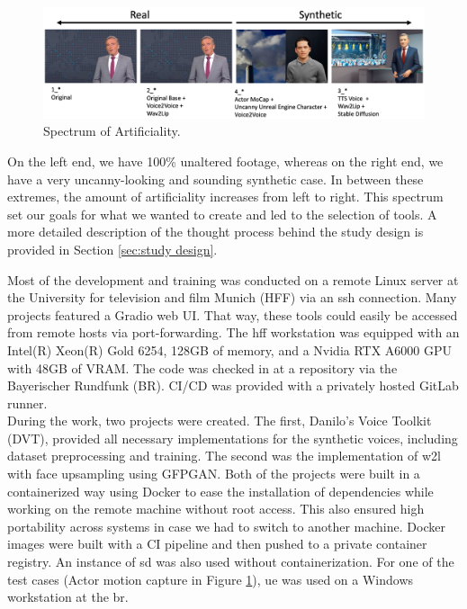 \documentclass[
  a4paper,  %
  twoside,  %
  bibliography=totoc,
  headsepline,
  cleardoublepage=empty,
  parskip=half,
  draft=false
]{scrbook}
\begin{document}
\begin{figure}[h]
  \centering
  \includegraphics[width=1\textwidth]{./graphics/spectrum-art.png}
  \caption{Spectrum of Artificiality.}
  \label{fig:spectrum}
\end{figure}

On the left end, we have 100\% unaltered footage, whereas on the right end, we have a very uncanny-looking and sounding synthetic case. In between these extremes, the amount of artificiality increases from left to right. This spectrum set our goals for what we wanted to create and led to the selection of tools. A more detailed description of the thought process behind the study design is provided in Section \ref{sec:study design}.

Most of the development and training was conducted on a remote Linux server at the University for television and film Munich (HFF) via an \gls{ssh} connection. Many projects featured a Gradio web UI. That way, these tools could easily be accessed from remote hosts via port-forwarding. The \gls{hff} workstation was equipped with an Intel(R) Xeon(R) Gold 6254, 128GB of memory, and a Nvidia RTX A6000 GPU with 48GB of VRAM. The code was checked in at a repository via the Bayerischer Rundfunk (BR). CI/CD was provided with a privately hosted GitLab runner. \\
During the work, two projects were created. The first, Danilo's Voice Toolkit (DVT), provided all necessary implementations for the synthetic voices, including dataset preprocessing and training. The second was the implementation of \gls{w2l} with face upsampling using GFPGAN. Both of the projects were built in a containerized way using Docker to ease the installation of dependencies while working on the remote machine without root access. This also ensured high portability across systems in case we had to switch to another machine. Docker images were built with a CI pipeline and then pushed to a private container registry. An instance of \gls{sd} was also used without containerization. For one of the test cases (Actor motion capture in Figure \ref{fig:spectrum}), \gls{ue} was used on a Windows workstation at the \gls{br}.
\end{document}
